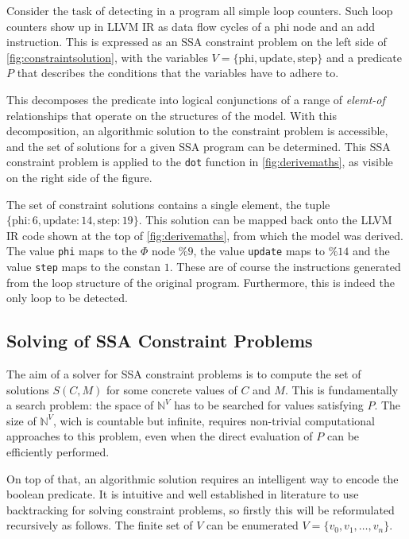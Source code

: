     Consider the task of detecting in a program all simple loop counters.
    Such loop counters show up in LLVM IR as data flow cycles of a phi node
    and an add instruction.
    This is expressed as an SSA constraint problem on the left side of
    \autoref{fig:constraintsolution}, with the variables
    $V=\{\text{phi}, \text{update}, \text{step}\}$ and a predicate $P$ that
    describes the conditions that the variables have to adhere to.

    This decomposes the predicate into logical conjunctions of a range of
    {\em elemt-of} relationships that operate on the structures of the model.
    With this decomposition, an algorithmic solution to the constraint problem
    is accessible, and the set of solutions for a given SSA program can be
    determined.
    This SSA constraint problem is applied to the {\tt dot} function in
    \autoref{fig:derivemaths}, as visible on the right side of the figure.

    The set of constraint solutions contains a single element, the tuple
    $\{\text{phi}:6,\text{update}:14,\text{step}:19\}$.
    This solution can be mapped back onto the LLVM IR code shown at the top of
    \autoref{fig:derivemaths}, from which the model was derived.
    The value {\tt phi} maps to the $\Phi$ node $\%9$, the value {\tt update}
    maps to $\%14$ and the value {\tt step} maps to the constan $1$.
    These are of course the instructions generated from the loop structure of
    the original program.
    Furthermore, this is indeed the only loop to be detected.

\subsection{Solving of SSA Constraint Problems}

    The aim of a solver for SSA constraint problems is to compute the set of
    solutions $S(C,M)$ for some concrete values of $C$ and $M$.
    This is fundamentally a search problem: the space of $\mathbb N^V$ has to be
    searched for values satisfying $P$.
    The size of $\mathbb N^V$, wich is countable but infinite, requires
    non-trivial computational approaches to this problem, even when the direct
    evaluation of $P$ can be efficiently performed.

    On top of that, an algorithmic solution requires an intelligent way to
    encode the boolean predicate.
    It is intuitive and well established in literature to use backtracking for
    solving constraint problems, so firstly this will be reformulated
    recursively as follows.
    The finite set of $V$ can be enumerated $V=\{v_0,v_1,\dots,v_n\}$.

